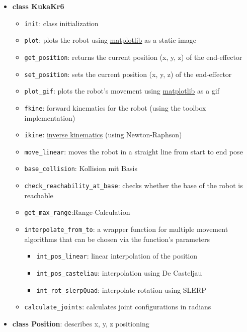 \begin{itemize}
    \item \textbf{class KukaKr6}
    \begin{itemize}
        \item \texttt{init}: class initialization
        \item \texttt{plot}: plots the robot using \href{https://matplotlib.org}{matplotlib} as a static image
        \item \texttt{get\_position}: returns the current position (x, y, z) of the end-effector
        \item \texttt{set\_position}: sets the current position (x, y, z) of the end-effector
        \item \texttt{plot\_gif}: plots the robot's movement using \href{https://matplotlib.org}{matplotlib} as a gif
        \item \texttt{fkine}: forward kinematics for the robot (using the toolbox implementation)
        \item \texttt{ikine}: \href{Inverse-Kinematic}{inverse kinematics} (using Newton-Raphson)
        \item \texttt{move\_linear}: moves the robot in a straight line from start to end pose
        \item \texttt{base\_collision}: Kollision mit Basis
        \item \texttt{check\_reachability\_at\_base}: checks whether the base of the robot is reachable
        \item \texttt{get\_max\_range}:Range-Calculation
        \item \texttt{interpolate\_from\_to}: a wrapper function for multiple movement algorithms that can be chosen via the function's parameters
        \begin{itemize}
            \item \texttt{int\_pos\_linear}: linear interpolation of the position
            \item \texttt{int\_pos\_casteliau}: interpolation using De Casteljau
            \item \texttt{int\_rot\_slerpQuad}: interpolate rotation using SLERP
        \end{itemize}
        \item \texttt{calculate\_joints}: calculates joint configurations in radians
    \end{itemize}
    \item \textbf{class Position}: describes x, y, z positioning
\end{itemize}


